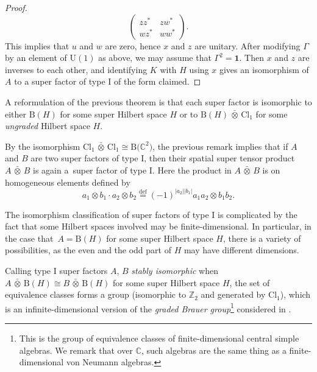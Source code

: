 \documentclass[11pt]{article}
\numberwithin{equation}{section}
\numberwithin{equation}{section}
\newcommand{\Z}{\mathbb{Z}}
\newcommand{\C}{\mathbb{C}}
\newcommand{\B}{\mathrm{B}}
\newcommand{\Cl}{\mathrm{Cl}}
\newcommand{\U}{\mathrm{U}}
\newcommand{\defeq}{\stackrel{\mathrm{def}}{=}}
\begin{document}
\begin{proof}
\begin{equation*}
 \begin{pmatrix} zz^* & z w^* \\ wz^* & ww^* \end{pmatrix}.
 \end{equation*}
 This implies that $u$ and $w$ are zero, hence $x$ and $z$ are unitary.
 After modifying $\Gamma$ by an element of $\U(1)$ as above, we may assume that $\Gamma^2 = \mathbf{1}$.
 Then $x$ and $z$ are inverses to each other, and identifying $K$ with $H$ using $x$ gives an isomorphism of $A$ to a super factor of type I of the form claimed.
\end{proof}

\begin{Remark}
A reformulation of the previous theorem is that each super factor is isomorphic to either $\B(H)$ for some super Hilbert space $H$ or to $\B(H) \,\bar{\otimes}\, \Cl_1$ for some \emph{ungraded} Hilbert space $H$.
\end{Remark}

\begin{Remark} \label{RemarkTensorProductFactor}
By the isomorphism $\Cl_1 \,\bar{\otimes}\, \Cl_1 \cong \B\big(\C^2\big)$, the previous remark implies that if $A$ and $B$ are two super factors of type I, then their spatial super tensor product $A \,\bar{\otimes}\, B$ is again a~super factor of type I. Here the product in $A \,\bar{\otimes}\, B$ is on homogeneous elements defined by
\begin{equation*}
a_1 \otimes b_1 \cdot a_2 \otimes b_2 \defeq (-1)^{|a_2||b_1|} a_1 a_2 \otimes b_1 b_2.
\end{equation*}
\end{Remark}

\begin{Remark}
The isomorphism classification of super factors of type I is complicated by the fact that some Hilbert spaces involved may be finite-dimensional.
In particular, in the case that~$A = \B(H)$ for some super Hilbert space $H$, there is a variety of possibilities, as the even and the odd part of $H$ may have different dimensions.

Calling type I super factors $A$, $B$ \emph{stably isomorphic} when $A \,\bar{\otimes}\, \B(H) \cong B \,\bar{\otimes}\, \B(H)$ for some super Hilbert space $H$, the set of equivalence classes forms a group (isomorphic to $\Z_2$ and generated by $\Cl_1$), which is an infinite-dimensional version of the \emph{graded Brauer group}\footnote{This is the group of equivalence classes of finite-dimensional central simple algebras.
We remark that over $\C$, such algebras are the same thing as a finite-dimensional von Neumann algebras.} considered in \cite{WallGradedBrauer}.
\end{Remark}
\end{document}

